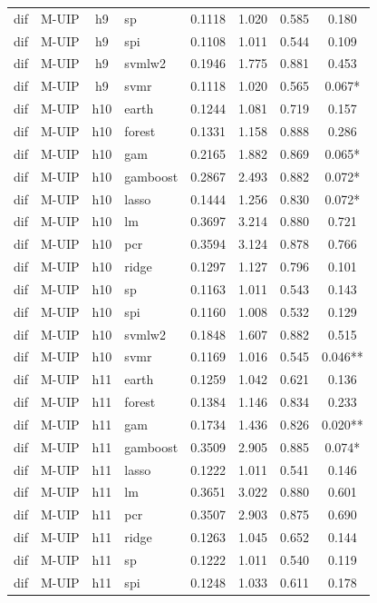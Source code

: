 \begin{ThreePartTable}
\begin{longtable}[t]{llclcccc}
dif & M-UIP & h9 & sp & 0.1118 & 1.020 & 0.585 & 0.180\\
dif & M-UIP & h9 & spi & 0.1108 & 1.011 & 0.544 & 0.109\\
dif & M-UIP & h9 & svmlw2 & 0.1946 & 1.775 & 0.881 & 0.453\\
dif & M-UIP & h9 & svmr & 0.1118 & 1.020 & 0.565 & 0.067*\\
\addlinespace
dif & M-UIP & h10 & earth & 0.1244 & 1.081 & 0.719 & 0.157\\
dif & M-UIP & h10 & forest & 0.1331 & 1.158 & 0.888 & 0.286\\
dif & M-UIP & h10 & gam & 0.2165 & 1.882 & 0.869 & 0.065*\\
dif & M-UIP & h10 & gamboost & 0.2867 & 2.493 & 0.882 & 0.072*\\
dif & M-UIP & h10 & lasso & 0.1444 & 1.256 & 0.830 & 0.072*\\
dif & M-UIP & h10 & lm & 0.3697 & 3.214 & 0.880 & 0.721\\
dif & M-UIP & h10 & pcr & 0.3594 & 3.124 & 0.878 & 0.766\\
dif & M-UIP & h10 & ridge & 0.1297 & 1.127 & 0.796 & 0.101\\
dif & M-UIP & h10 & sp & 0.1163 & 1.011 & 0.543 & 0.143\\
dif & M-UIP & h10 & spi & 0.1160 & 1.008 & 0.532 & 0.129\\
dif & M-UIP & h10 & svmlw2 & 0.1848 & 1.607 & 0.882 & 0.515\\
dif & M-UIP & h10 & svmr & 0.1169 & 1.016 & 0.545 & 0.046**\\
\addlinespace
dif & M-UIP & h11 & earth & 0.1259 & 1.042 & 0.621 & 0.136\\
dif & M-UIP & h11 & forest & 0.1384 & 1.146 & 0.834 & 0.233\\
dif & M-UIP & h11 & gam & 0.1734 & 1.436 & 0.826 & 0.020**\\
dif & M-UIP & h11 & gamboost & 0.3509 & 2.905 & 0.885 & 0.074*\\
dif & M-UIP & h11 & lasso & 0.1222 & 1.011 & 0.541 & 0.146\\
dif & M-UIP & h11 & lm & 0.3651 & 3.022 & 0.880 & 0.601\\
dif & M-UIP & h11 & pcr & 0.3507 & 2.903 & 0.875 & 0.690\\
dif & M-UIP & h11 & ridge & 0.1263 & 1.045 & 0.652 & 0.144\\
dif & M-UIP & h11 & sp & 0.1222 & 1.011 & 0.540 & 0.119\\
dif & M-UIP & h11 & spi & 0.1248 & 1.033 & 0.611 & 0.178\\

\end{longtable}
\end{ThreePartTable}
